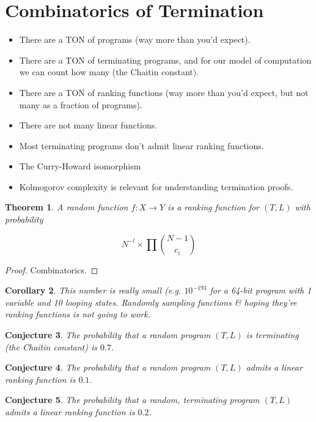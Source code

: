\documentclass[preprint]{sigplanconf}
\newtheorem{theorem}{Theorem}
\newtheorem{corollary}[theorem]{Corollary}
\newtheorem{conjecture}[theorem]{Conjecture}
\theoremstyle{definition}
\begin{document}
\section{Combinatorics of Termination}

\begin{itemize}
 \item There are a TON of programs (way more than you'd expect).
 \item There are a TON of terminating programs, and for our model of computation we can count
  how many (the Chaitin constant).
 \item There are a TON of ranking functions (way more than you'd expect, but not many as a
  fraction of programs).
 \item There are not many linear functions.
 \item Most terminating programs don't admit linear ranking functions.
 \item The Curry-Howard isomorphism
 \item Kolmogorov complexity is relevant for understanding termination proofs.
\end{itemize}


\begin{theorem}
 A random function $f : X \to Y$ is a ranking function for $(T, L)$ with probability

 $$N^{-l} \times \prod {{N-1} \choose c_i}$$
\end{theorem}

\begin{proof}
 Combinatorics.
\end{proof}


\begin{corollary}
 This number is really small (e.g. $10^{-193}$ for a 64-bit program with 1 variable and 10 looping states.
 Randomly sampling functions \& hoping they're ranking functions is not going to work.
\end{corollary}


\begin{conjecture}
 The probability that a random program $(T, L)$ is terminating (the Chaitin constant)
 is $0.7$.
\end{conjecture}

\begin{conjecture}
 The probability that a random program $(T, L)$ admits a linear ranking function is
 $0.1$.
\end{conjecture}

\begin{conjecture}
 The probability that a random, terminating program $(T, L)$ admits a linear ranking function
 is $0.2$.
\end{conjecture}
\end{document}
